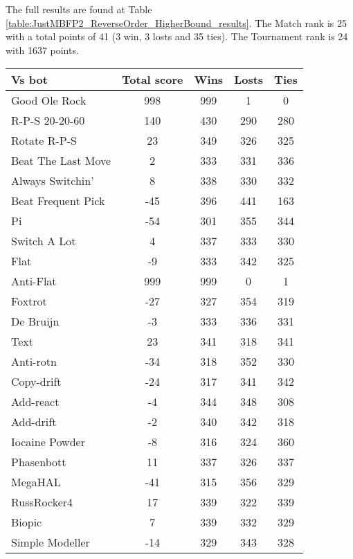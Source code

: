 The full results are found at Table \ref{table:JustMBFP2_ReverseOrder_HigherBound_results}. The Match rank is 25 with a total points of 41 (3 win, 3 losts and 35 ties). The Tournament rank is 24 with 1637 points.

\begin{table*}
    \caption{JustMBFP2_ReverseOrder_HigherBound results}
    \label{table:JustMBFP2_ReverseOrder_HigherBound_results}
    \centering
    \begin{tabular}{|l|c|c|c|c|}
        \hline
        \textbf{Vs bot} & \textbf{Total score} & \textbf{Wins} & \textbf{Losts} & \textbf{Ties} \\ \hline
Good Ole Rock & 998 & 999 & 1 & 0 \\ \hline 
R-P-S 20-20-60 & 140 & 430 & 290 & 280 \\ \hline 
Rotate R-P-S & 23 & 349 & 326 & 325 \\ \hline 
Beat The Last Move & 2 & 333 & 331 & 336 \\ \hline 
Always Switchin' & 8 & 338 & 330 & 332 \\ \hline 
Beat Frequent Pick & -45 & 396 & 441 & 163 \\ \hline 
Pi & -54 & 301 & 355 & 344 \\ \hline 
Switch A Lot & 4 & 337 & 333 & 330 \\ \hline 
Flat & -9 & 333 & 342 & 325 \\ \hline 
Anti-Flat & 999 & 999 & 0 & 1 \\ \hline 
Foxtrot & -27 & 327 & 354 & 319 \\ \hline 
De Bruijn & -3 & 333 & 336 & 331 \\ \hline 
Text & 23 & 341 & 318 & 341 \\ \hline 
Anti-rotn & -34 & 318 & 352 & 330 \\ \hline 
Copy-drift & -24 & 317 & 341 & 342 \\ \hline 
Add-react & -4 & 344 & 348 & 308 \\ \hline 
Add-drift & -2 & 340 & 342 & 318 \\ \hline 
Iocaine Powder & -8 & 316 & 324 & 360 \\ \hline 
Phasenbott & 11 & 337 & 326 & 337 \\ \hline 
MegaHAL & -41 & 315 & 356 & 329 \\ \hline 
RussRocker4 & 17 & 339 & 322 & 339 \\ \hline 
Biopic & 7 & 339 & 332 & 329 \\ \hline 
Simple Modeller & -14 & 329 & 343 & 328 \\ \hline 

\end{tabular}
\end{table*}
